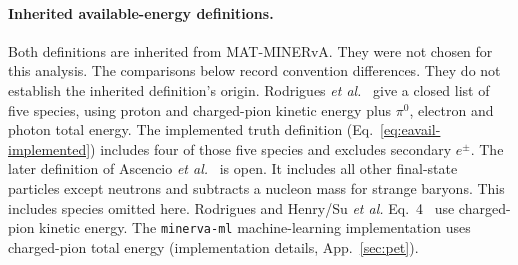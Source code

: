 \paragraph{Inherited available-energy definitions.} Both definitions are inherited from MAT-MINERvA. They were not chosen for this analysis. The comparisons below record convention differences. They do not establish the inherited definition's origin. Rodrigues \emph{et al.}~\cite{MINERvA:2016lowrecoil} give a closed list of five species, using proton and charged-pion kinetic energy plus $\pi^0$, electron and photon total energy. The implemented truth definition (Eq.~\eqref{eq:eavail-implemented}) includes four of those five species and excludes secondary $e^\pm$. The later definition of Ascencio \emph{et al.}~\cite{MINERvA:2022incl} is open. It includes all other final-state particles except neutrons and subtracts a nucleon mass for strange baryons. This includes species omitted here. Rodrigues and Henry/Su \emph{et al.} Eq.~4~\cite{MINERvA:2023avz} use charged-pion kinetic energy. The \texttt{minerva-ml} machine-learning implementation uses charged-pion total energy (implementation details, App.~\ref{sec:pet}).

